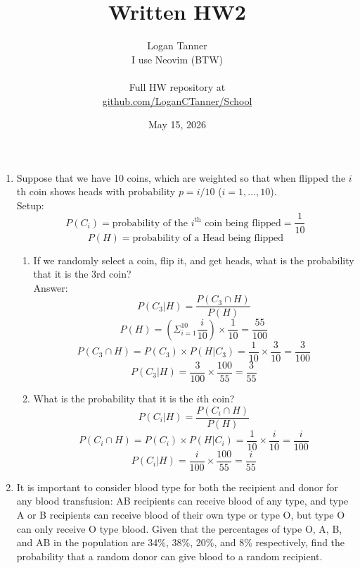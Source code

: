 \documentclass{article}
\title{Written HW2}
\author{
    Logan Tanner \\ 
    I use Neovim (BTW) \\ 
    \\
    Full HW repository at \\
    \href{https://github.com/LoganCTanner/School/tree/main/Math/425-Probability}{github.com/LoganCTanner/School}
}
\date{May 15, 2026}
\begin{document}
\maketitle

\begin{enumerate}
    \clearpage
    \item Suppose that we have 10 coins, which are weighted so that when flipped the $i$th coin shows heads with probability $p = i/10$ ($i = 1, \ldots,10$).
        \\
        Setup:
        $$ P(C_i) = \text{probability of the $i^\text{th}$ coin being flipped}  = \frac{1}{10} $$
        $$ P(H) = \text{probability of a Head being flipped} $$
    \begin{enumerate}
        \item If we randomly select a coin, flip it, and get heads, what is the probability that it is the 3rd coin?
        \\
        Answer:
        $$ P(C_3 | H) = \frac{P(C_3 \cap H)}{P(H)} $$
        $$ P(H) = (\Sigma_{i=1}^{10} \frac{i}{10}) \times \frac{1}{10} = \frac{55}{100} $$
        $$ P(C_3 \cap H) = P(C_3) \times P(H | C_3) = \frac{1}{10} \times \frac{3}{10} = \frac{3}{100} $$
        $$ P(C_3 | H) = \frac{3}{100} \times \frac{100}{55} = \boxed{\frac{3}{55}} $$

        \item What is the probability that it is the $i$th coin?
        $$ P(C_i | H) = \frac{P(C_i \cap H)}{P(H)} $$
        $$ P(C_i \cap H) = P(C_i) \times P(H | C_i) = \frac{1}{10} \times \frac{i}{10} = \frac{i}{100} $$
        $$ P(C_i | H) = \frac{i}{100} \times \frac{100}{55} = \boxed{\frac{i}{55}} $$
    \end{enumerate}
    
    \clearpage
    \item It is important to consider blood type for both the recipient and donor for any blood transfusion: AB recipients can receive blood of any type, and type A or B recipients can receive blood of their own type or type O, but type O can only receive O type blood. Given that the percentages of type O, A, B, and AB in the population are 34\%, 38\%, 20\%, and 8\% respectively, find the probability that a random donor can give blood to a random recipient. 


\end{enumerate}
\end{document}
